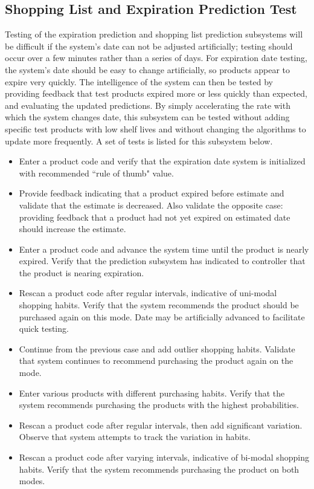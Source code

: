\documentclass[11pt]{article} %
\begin{document}
\subsection{Shopping List and Expiration Prediction Test}
Testing of the expiration prediction and shopping list prediction subsystems will be difficult if the system's date can not be adjusted artificially; testing should occur over a few minutes rather than a series of days. For expiration date testing, the system's date should be easy to change artificially, so products appear to expire very quickly. The intelligence of the system can then be tested by providing feedback that test products expired more or less quickly than expected, and evaluating the updated predictions. By simply accelerating the rate with which the system changes date, this subsystem can be tested without adding specific test products with low shelf lives and without changing the algorithms to update more frequently. A set of tests is listed for this subsystem below.
\begin{itemize}
\item Enter a product code and verify that the expiration date system is initialized with recommended ``rule of thumb" value.
\item Provide feedback indicating that a product expired before estimate and validate that the estimate is decreased. Also validate the opposite case: providing feedback that a product had not yet expired on estimated date should increase the estimate.
\item Enter a product code and advance the system time until the product is nearly expired. Verify that the prediction subsystem has indicated to controller that the product is nearing expiration.
\item Rescan a product code after regular intervals, indicative of uni-modal shopping habits. Verify that the system recommends the product should be purchased again on this mode. Date may be artificially advanced to facilitate quick testing.
\item Continue from the previous case and add outlier shopping habits. Validate that system continues to recommend purchasing the product again on the mode.
\item Enter various products with different purchasing habits. Verify that the system recommends purchasing the products with the highest probabilities.
\item Rescan a product code after regular intervals, then add significant variation. Observe that system attempts to track  the variation in habits.
\item Rescan a product code after varying intervals, indicative of bi-modal shopping habits. Verify that the system recommends purchasing the product on both modes.
\end{itemize}
\end{document}
